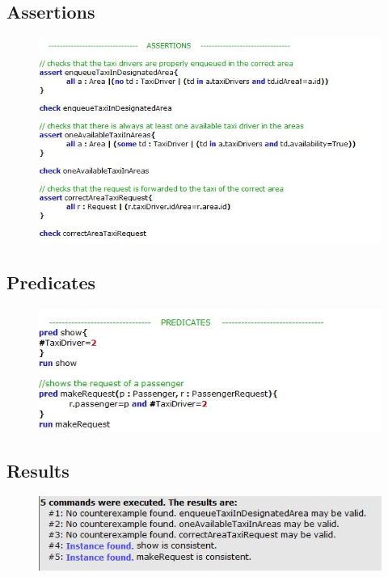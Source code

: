 \documentclass[18pt,oneside,a4paper, titlepage]{article}
\begin{document}
	\subsection{Assertions}
	\begin{figure}[h]
		\includegraphics[scale=0.8]{assertions.jpg}
	\end{figure}
	
	\subsection{Predicates}
		\begin{figure}[h]
			\includegraphics[scale=0.8]{predicates.jpg}
		\end{figure}
\newpage
	\subsection{Results}
		\begin{figure}[h]
			\includegraphics[scale=1]{results.jpg}
		\end{figure}
\newpage
\end{document}
